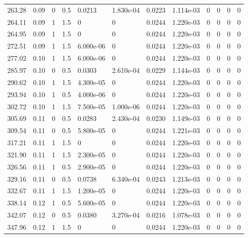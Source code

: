 \documentclass[preview]{standalone}
\begin{document}
{{{\begin{tabular}{L{1.2cm}C{1.2cm} C{0.3cm}C{0.5cm} C{1.4cm}C{1.4cm} C{1.4cm}C{1.4cm} C{1.6cm}C{1.6cm} C{1.6cm}C{1.6cm}}
  263.28  &  0.09  & 0     & 0.5 &  0.0213  & 1.830e-04  &  0.0223&   1.114e-03& 0 & 0   &  0 & 0  \\ 
  264.11  &  0.09  & 1     & 1.5 &  0  & 0  &  0.0244&   1.220e-03& 0 & 0   &  0 & 0  \\ 
  264.95  &  0.09  & 1     & 1.5 &  0  & 0  &  0.0244&   1.220e-03& 0 & 0   &  0 & 0  \\ 
  272.51  &  0.09  & 1     & 1.5 &  6.000e-06  & 0  &  0.0244&   1.220e-03& 0 & 0   &  0 & 0  \\ 
  277.02  &  0.10  & 1     & 1.5 &  6.000e-06  & 0  &  0.0244&   1.220e-03& 0 & 0   &  0 & 0  \\ 
  285.97  &  0.10  & 0     & 0.5 &  0.0303  & 2.610e-04  &  0.0229&   1.144e-03& 0 & 0   &  0 & 0  \\ 
  290.62  &  0.10  & 1     & 1.5 &  4.300e-05  & 0  &  0.0244&   1.220e-03& 0 & 0   &  0 & 0  \\ 
  293.94  &  0.10  & 1     & 0.5 &  4.000e-06  & 0  &  0.0244&   1.220e-03& 0 & 0   &  0 & 0  \\ 
  302.72  &  0.10  & 1     & 1.5 &  7.500e-05  & 1.000e-06  &  0.0244&   1.220e-03& 0 & 0   &  0 & 0  \\ 
  305.69  &  0.11  & 0     & 0.5 &  0.0283  & 2.430e-04  &  0.0230&   1.149e-03& 0 & 0   &  0 & 0  \\ 
  309.54  &  0.11  & 0     & 0.5 &  5.800e-05  & 0  &  0.0244&   1.221e-03& 0 & 0   &  0 & 0  \\ 
  317.21  &  0.11  & 1     & 1.5 &  0  & 0  &  0.0244&   1.220e-03& 0 & 0   &  0 & 0  \\ 
  321.90  &  0.11  & 1     & 1.5 &  2.300e-05  & 0  &  0.0244&   1.220e-03& 0 & 0   &  0 & 0  \\ 
  326.56  &  0.11  & 1     & 0.5 &  2.900e-05  & 0  &  0.0244&   1.220e-03& 0 & 0   &  0 & 0  \\ 
  329.16  &  0.11  & 0     & 0.5 &  0.0738  & 6.340e-04  &  0.0243&   1.213e-03& 0 & 0   &  0 & 0  \\ 
  332.67  &  0.11  & 1     & 1.5 &  1.200e-05  & 0  &  0.0244&   1.220e-03& 0 & 0   &  0 & 0  \\ 
  338.14  &  0.12  & 1     & 0.5 &  5.600e-05  & 0  &  0.0244&   1.220e-03& 0 & 0   &  0 & 0  \\ 
  342.07  &  0.12  & 0     & 0.5 &  0.0380  & 3.270e-04  &  0.0216&   1.078e-03& 0 & 0   &  0 & 0  \\ 
  347.96  &  0.12  & 1     & 1.5 &  0  & 0  &  0.0244&   1.220e-03& 0 & 0   &  0 & 0  \\ 

\end{tabular}}}}
\end{document}
